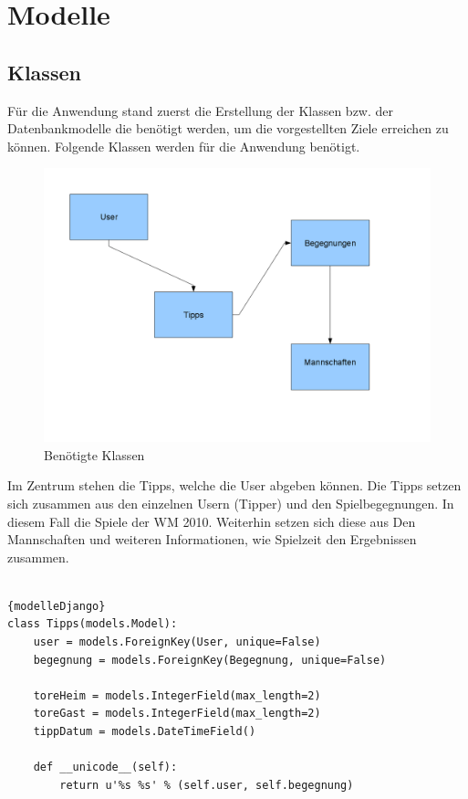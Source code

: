 \documentclass[titlepage, 12pt,a4paper]{scrartcl}
\begin{document}
\section{Modelle}
\subsection{Klassen}
Für die Anwendung stand zuerst die Erstellung der Klassen bzw. der
Datenbankmodelle die benötigt werden, um die vorgestellten Ziele erreichen zu
können. Folgende Klassen werden für die Anwendung benötigt. 

\begin{figure}[ht]
 \begin{center}
  \includegraphics[scale=0.5]{pictures/klassen.png}
 \end{center}
 \caption{Benötigte Klassen}
 \label{klassen}
\end{figure}

Im Zentrum stehen die Tipps, welche die User abgeben können. Die Tipps setzen
sich zusammen aus den einzelnen Usern (Tipper) und den Spielbegegnungen. In
diesem Fall die Spiele der WM 2010. Weiterhin setzen sich diese aus Den
Mannschaften und weiteren Informationen, wie Spielzeit den Ergebnissen zusammen.
\\
\\

\begin{lstlisting}[caption=Modelle in Django]{modelleDjango}
class Tipps(models.Model):
    user = models.ForeignKey(User, unique=False)
    begegnung = models.ForeignKey(Begegnung, unique=False)
    
    toreHeim = models.IntegerField(max_length=2)
    toreGast = models.IntegerField(max_length=2)
    tippDatum = models.DateTimeField()
    
    def __unicode__(self):
        return u'%s %s' % (self.user, self.begegnung)
   
\end{lstlisting}
\end{document}
